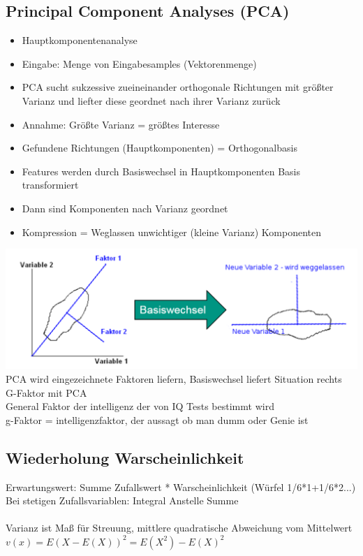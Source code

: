 \documentclass[a4paper,10pt,oneside]{article}
\begin{document}
\subsection{Principal Component Analyses (PCA)}
\begin{itemize}
	\item Hauptkomponentenanalyse
	\item Eingabe: Menge von Eingabesamples (Vektorenmenge)
	\item PCA sucht sukzessive zueineinander orthogonale Richtungen mit größter Varianz und liefter diese geordnet nach ihrer Varianz zurück
	\item Annahme: Größte Varianz = größtes Interesse
	\item Gefundene Richtungen (Hauptkomponenten) = Orthogonalbasis
	\item Features werden durch Basiswechsel in Hauptkomponenten Basis transformiert
	\item Dann sind Komponenten nach Varianz geordnet
	\item Kompression = Weglassen unwichtiger (kleine Varianz) Komponenten
\end{itemize}

\includegraphics[scale=0.65]{Grafiken/basiswechsel.png}
PCA wird eingezeichnete Faktoren liefern, Basiswechsel liefert Situation rechts\\
G-Faktor mit PCA\\
General Faktor der intelligenz der von IQ Tests bestimmt wird\\
g-Faktor = intelligenzfaktor, der aussagt ob man dumm oder Genie ist




\subsection{Wiederholung Warscheinlichkeit}
Erwartungswert: Summe Zufallswert * Warscheinlichkeit (Würfel 1/6*1+1/6*2...)\\
Bei stetigen Zufallsvariablen: Integral Anstelle Summe \\
\\
Varianz ist Maß für Streuung, mittlere quadratische Abweichung vom Mittelwert
$v(x) = E(X-E(X))^2 = E(X^2) - E(X)^2$\\
\end{document}
